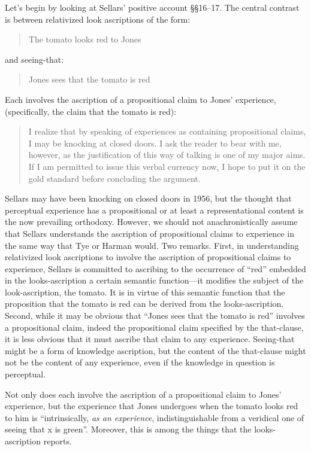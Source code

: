 \documentclass[11pt]{article}
\begin{document}
Let's begin by looking at Sellars' positive account §§16--17. The central contrast is between relativized look ascriptions of the form:
\begin{quote}
    The tomato looks red to Jones
\end{quote}
and seeing-that:
\begin{quote}
    Jones sees that the tomato is red
\end{quote}

Each involves the ascription of a propositional claim to Jones' experience, (specifically, the claim that the tomato is red):
\begin{quote}
    I realize that by speaking of experiences as containing propositional claims, I may be knocking at closed doors. I ask the reader to bear with me, however, as the justification of this way of talking is one of my major aims. If I am permitted to issue this verbal currency now, I hope to put it on the gold standard before concluding the argument.
\end{quote}
Sellars may have been knocking on closed doors in 1956, but the thought that perceptual experience has a propositional or at least a representational content is the now prevailing orthodoxy. However, we should not anachronistically assume that Sellars understands the ascription of propositional claims to experience in the same way that Tye or Harman would. Two remarks. First, in understanding relativized look ascriptions to involve the ascription of propositional claims to experience, Sellars is committed to ascribing to the occurrence of ``red'' embedded in the looks-ascription a certain semantic function---it modifies the subject of the look-ascription, the tomato. It is in virtue of this semantic function that the proposition that the tomato is red can be derived from the looks-ascription. Second, while it may be obvious that ``Jones sees that the tomato is red'' involves a propositional claim, indeed the propositional claim specified by the that-clause, it is less obvious that it must ascribe that claim to any experience. Seeing-that might be a form of knowledge ascription, but the content of the that-clause might not be the content of any experience, even if the knowledge in question is perceptual.

Not only does each involve the ascription of a propositional claim to Jones' experience, but the experience that Jones undergoes when the tomato looks red to him is ``intrinsically, \emph{as an experience}, indistinguishable from a veridical one of seeing that x is green''. Moreover, this is among the things that the looks-ascription reports.
\end{document}
